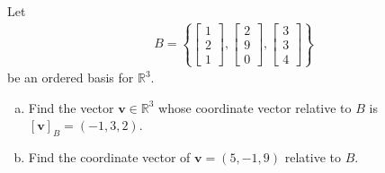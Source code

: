 \documentclass[12pt,letterpaper,reqno]{article}
\numberwithin{equation}{section}
\newcommand{\R}{\ensuremath{\mathbb R}}
\begin{document}
\begin{exercise}
Let 
\begin{align*}
	B=\left\{\begin{bmatrix}
		1 \\ 2 \\1
	\end{bmatrix}, \begin{bmatrix}
		2 \\ 9 \\ 0
	\end{bmatrix}, \begin{bmatrix}
		3 \\ 3 \\4
	\end{bmatrix}
	\right\}
\end{align*}	
be an ordered basis for $\R^3$.
\begin{enumerate}[(a)]
	\item Find the vector $\mathbf{v} \in \R^3$ whose coordinate vector relative to $B$ is $[\mathbf{v}]_B=(-1,3,2)$.
	\item Find the coordinate vector of $\mathbf{v}=(5,-1,9)$ relative to $B$.
\end{enumerate}
\end{exercise}
\end{document}
